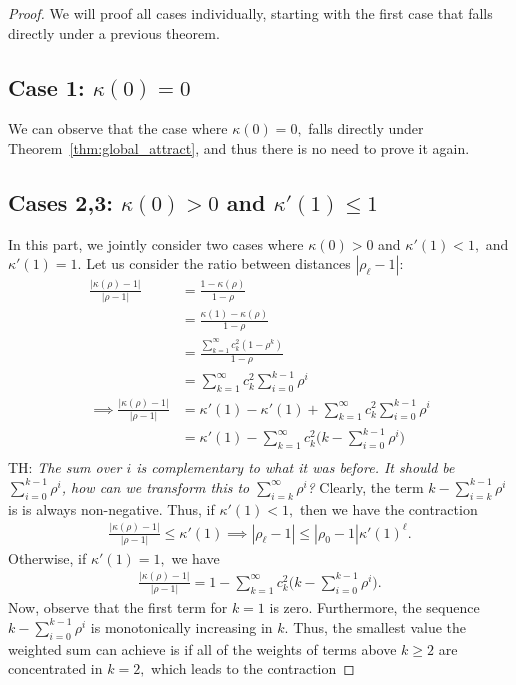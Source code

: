 \documentclass[twoside]{article}
\theoremstyle{definition}
\newcommand{\thomas}[1]{{\color{blue}TH:  \textit{#1}}}
\begin{document}
\begin{proof}
We will proof all cases individually, starting with the first case that falls directly under a previous theorem. 

\subsection*{Case 1: $\kappa(0)=0$}
We can observe that the case where $\kappa(0)=0,$ falls directly under Theorem~\ref{thm:global_attract}, and thus there is no need to prove it again.

\subsection*{Cases 2,3: $\kappa(0)>0$ and $\kappa'(1)\le 1$} In this part, we jointly consider two cases where $\kappa(0)>0$ and $\kappa'(1) < 1,$ and $\kappa'(1)=1.$ Let us consider the ratio between distances $|\rho_\ell-1|$:
\begin{align*}
    \frac{|\kappa(\rho)-1|}{|\rho-1|} &= \frac{1-\kappa(\rho)}{1-\rho} \\
    &=\frac{\kappa(1)-\kappa(\rho)}{1-\rho}\\
    &=\frac{\sum_{k=1}^\infty c_k^2 (1-\rho^k)}{1-\rho}\\
    &=\sum_{k=1}^\infty c_k^2 \sum_{i=0}^{k-1}\rho^i\\
\implies \frac{|\kappa(\rho)-1|}{|\rho-1|} &=\kappa'(1)-\kappa'(1)+\sum_{k=1}^\infty c_k^2 \sum_{i=0}^{k-1} \rho^i\\
&= \kappa'(1)-\sum_{k=1}^\infty c_k^2 \big(k-\sum_{i=0}^{k-1} \rho^i\big)\\
\end{align*}
\thomas{The sum over $i$ is complementary to what it was before. It should be $\sum_{i=0}^{k-1} \rho^i$, how can we transform this to $\sum_{i=k}^\infty \rho^i$?}
Clearly, the term $k-\sum_{i=k}^{k-1} \rho^i$ is is always non-negative. Thus, if $\kappa'(1)<1,$ then we have the contraction 
\begin{align*}
    \frac{|\kappa(\rho)-1|}{|\rho-1|} \le \kappa'(1) \implies |\rho_\ell-1| \le |\rho_0-1| \kappa'(1)^\ell.
\end{align*}
Otherwise, if $\kappa'(1)=1,$ we have 
\begin{align*}
    \frac{|\kappa(\rho)-1|}{|\rho-1|} = 1-\sum_{k=1}^\infty c_k^2 \big(k-\sum_{i=0}^{k-1} \rho^i\big).
\end{align*}
Now, observe that the first term for $k=1$ is zero. Furthermore, the sequence $k-\sum_{i=0}^{k-1}\rho^i$ is monotonically increasing in $k$. Thus, the smallest value the weighted sum can achieve is if all of the weights of terms above $k\ge 2$ are concentrated in $k=2,$ which leads to the contraction

\end{proof}
\end{document}
